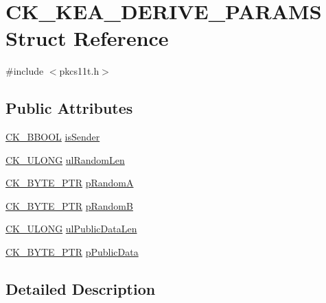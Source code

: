 \hypertarget{struct_c_k___k_e_a___d_e_r_i_v_e___p_a_r_a_m_s}{}\section{C\+K\+\_\+\+K\+E\+A\+\_\+\+D\+E\+R\+I\+V\+E\+\_\+\+P\+A\+R\+A\+MS Struct Reference}
\label{struct_c_k___k_e_a___d_e_r_i_v_e___p_a_r_a_m_s}


{\ttfamily \#include $<$pkcs11t.\+h$>$}

\subsection*{Public Attributes}
\begin{DoxyCompactItemize}
\item 
\hyperlink{pkcs11t_8h_abd07a1bba363f8083080b9328e67b491}{C\+K\+\_\+\+B\+B\+O\+OL} \hyperlink{struct_c_k___k_e_a___d_e_r_i_v_e___p_a_r_a_m_s_af0877d5766fe83380e61e44ffa913c28}{is\+Sender}
\item 
\hyperlink{pkcs11t_8h_a35181858a3b7a0a81f49d180d8f446ef}{C\+K\+\_\+\+U\+L\+O\+NG} \hyperlink{struct_c_k___k_e_a___d_e_r_i_v_e___p_a_r_a_m_s_a262da7e616b091eb5287cd0c04334c21}{ul\+Random\+Len}
\item 
\hyperlink{pkcs11t_8h_a3d7233a4077fbaf7ae76b64da0a62a21}{C\+K\+\_\+\+B\+Y\+T\+E\+\_\+\+P\+TR} \hyperlink{struct_c_k___k_e_a___d_e_r_i_v_e___p_a_r_a_m_s_a5c0c4f6be3ecb7ee67527cbbd282e3f0}{p\+RandomA}
\item 
\hyperlink{pkcs11t_8h_a3d7233a4077fbaf7ae76b64da0a62a21}{C\+K\+\_\+\+B\+Y\+T\+E\+\_\+\+P\+TR} \hyperlink{struct_c_k___k_e_a___d_e_r_i_v_e___p_a_r_a_m_s_a271ca66a7ee8901646bbce325f79693a}{p\+RandomB}
\item 
\hyperlink{pkcs11t_8h_a35181858a3b7a0a81f49d180d8f446ef}{C\+K\+\_\+\+U\+L\+O\+NG} \hyperlink{struct_c_k___k_e_a___d_e_r_i_v_e___p_a_r_a_m_s_ab5dc5d78b8ef7e9b47131a892724d147}{ul\+Public\+Data\+Len}
\item 
\hyperlink{pkcs11t_8h_a3d7233a4077fbaf7ae76b64da0a62a21}{C\+K\+\_\+\+B\+Y\+T\+E\+\_\+\+P\+TR} \hyperlink{struct_c_k___k_e_a___d_e_r_i_v_e___p_a_r_a_m_s_a78d21f7c6d0e1088469f8fee48088266}{p\+Public\+Data}
\end{DoxyCompactItemize}


\subsection{Detailed Description}


